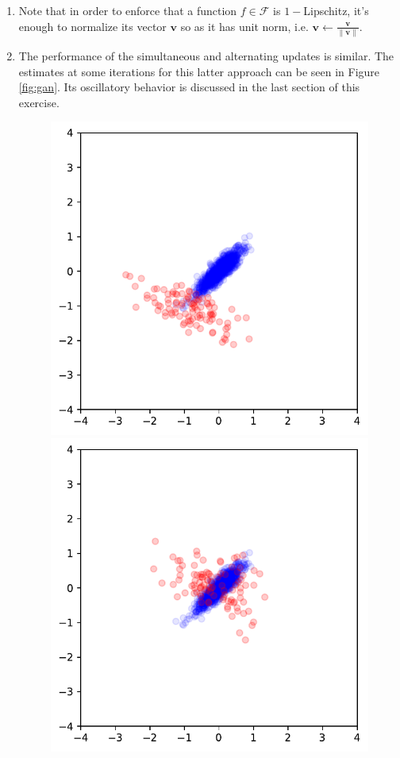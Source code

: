 \documentclass[letterpaper]{article}
\providecommand{\vv}{\mathbf{v}}
\providecommand{\1}{\mathbf{1}}
\providecommand{\0}{\mathbf{0}}
\providecommand{\norm}[1]{\ensuremath{\left\lVert#1\right\rVert}}
\begin{document}
\begin{enumerate}
    \item Note that in order to enforce that a function $f\in \mathcal{F}$ is $1-$Lipschitz, it's enough to normalize its vector $\vv$ so as it has unit norm, i.e. $\vv \leftarrow \frac{\vv}{\norm{\vv}}$.
    \item 
    The performance of the simultaneous and alternating updates is similar. The estimates at some iterations for this latter approach can be seen in Figure \ref{fig:gan}. Its oscillatory behavior is discussed in the last section of this exercise.
    \begin{figure}
        \centering
        \begin{minipage}{.3\textwidth}
         \includegraphics[width=.9\textwidth]{gan1}
        \end{minipage}
        \begin{minipage}{.3\textwidth}
         \includegraphics[width=.9\textwidth]{gan2}

\end{minipage}
\end{figure}
\end{enumerate}
\end{document}
